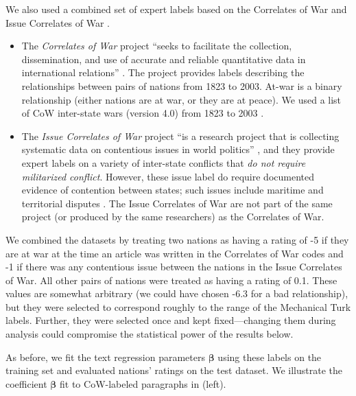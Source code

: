 We also used a combined set of expert labels based on the Correlates
of War \citep{sarkees:2010} and Issue Correlates of War
\citep{hensel:2001}.
\begin{itemize}
  \item The \emph{Correlates of War} project ``seeks to facilitate the
    collection, dissemination, and use of accurate and reliable
    quantitative data in international relations''
    \citep{cow_webpage:2012}.  The project provides labels describing the
    relationships between pairs of nations from 1823 to 2003.
    At-war is a binary relationship (either nations are at war, or
    they are at peace). We used a list of CoW inter-state wars
    (version 4.0) from 1823 to 2003
    \citep{sarkees:2010}.
  \item The \emph{Issue Correlates of War} project ``is a research
    project that is collecting systematic data on contentious issues
    in world politics'' \citep{icow_webpage:2012}, and they provide
    expert labels on a variety of inter-state conflicts that \emph{do
      not require militarized conflict}.  However, these issue label
    do require documented evidence of contention between states; such
    issues include maritime and territorial disputes
    \citep{icow_webpage:2012,hensel:2001}. The Issue Correlates of War
    are not part of the same project (or produced by the same
    researchers) as the Correlates of War.
\end{itemize}

We combined the datasets by treating two nations as having a rating
of -5 if they are at war at the time an article was written in the
Correlates of War codes and -1 if there was any contentious issue
between the nations in the Issue Correlates of War.  All other pairs
of nations were treated as having a rating of 0.1.  These values are
somewhat arbitrary (we could have chosen -6.3 for a bad relationship),
but they were selected to correspond roughly to the range of the
Mechanical Turk labels.  Further, they were selected once and kept
fixed---changing them during analysis could compromise the statistical
power of the results below.

As before, we fit the text regression parameters $\bm \beta$ using
these labels on the training set and evaluated nations' ratings on
the test dataset. We illustrate the coefficient $\bm \beta$ fit to
CoW-labeled paragraphs in  (left).

